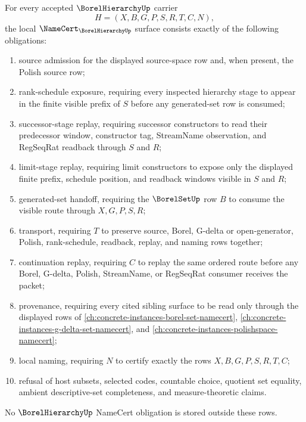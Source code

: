 \begin{theorem}
\label{thm:borel-hierarchy-namecert-obligations}
For every accepted $\BorelHierarchyUp$ carrier
$$
H=(X,B,G,P,S,R,T,C,N),
$$
the local $\NameCert_{\BorelHierarchyUp}$ surface consists exactly of the following obligations:
\begin{enumerate}
\item source admission for the displayed source-space row and, when present, the Polish source row;
\item rank-schedule exposure, requiring every inspected hierarchy stage to appear in the finite visible prefix of $S$ before any generated-set row is consumed;
\item successor-stage replay, requiring successor constructors to read their predecessor window, constructor tag, StreamName observation, and RegSeqRat readback through $S$ and $R$;
\item limit-stage replay, requiring limit constructors to expose only the displayed finite prefix, schedule position, and readback windows visible in $S$ and $R$;
\item generated-set handoff, requiring the $\BorelSetUp$ row $B$ to consume the visible route through $X,G,P,S,R$;
\item transport, requiring $T$ to preserve source, Borel, G-delta or open-generator, Polish, rank-schedule, readback, replay, and naming rows together;
\item continuation replay, requiring $C$ to replay the same ordered route before any Borel, G-delta, Polish, StreamName, or RegSeqRat consumer receives the packet;
\item provenance, requiring every cited sibling surface to be read only through the displayed rows of \autoref{ch:concrete-instances-borel-set-namecert}, \autoref{ch:concrete-instances-g-delta-set-namecert}, and \autoref{ch:concrete-instances-polishspace-namecert};
\item local naming, requiring $N$ to certify exactly the rows $X,B,G,P,S,R,T,C$;
\item refusal of host subsets, selected codes, countable choice, quotient set equality, ambient descriptive-set completeness, and measure-theoretic claims.
\end{enumerate}
No $\BorelHierarchyUp$ NameCert obligation is stored outside these rows.
\end{theorem}
